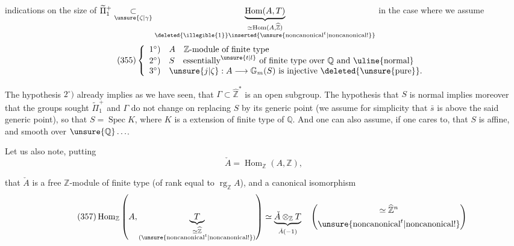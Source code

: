 

indications on the size of $\widetilde\Pi_1^{+}\underset{\unsure{\zeta|\gamma}}{\subset}\underbrace{\operatorname{Hom}(A,T)}_{\substack{\simeq\operatorname{Hom}(A,\widehat{\mathbb Z})\\\deleted{\illegible{1}}\inserted{\unsure{\text{noncanonical}^{t}|\text{noncanonical!}}}}}$ in the case where we assume
\[
\tag{355}
\left\{\begin{array}{ll}
1^\circ) & A\quad\mathbb Z\text{-module of finite type}\\
2^\circ) & S\quad\text{essentially}^{\unsure{t|l}}\text{ of finite type over }\mathbb Q\text{ and \uline{normal}}\\
3^\circ) & \unsure{j|\zeta}:A\longrightarrow\mathbb G_m(S)\text{ is injective }\deleted{\unsure{\text{pure}}}.
\end{array}\right.
\]

The hypothesis $2^\circ)$ already implies as we have seen, that $\Gamma\subset\widehat{\mathbb Z}^{*}$ is an open subgroup. The hypothesis that $S$ is normal implies moreover that the groups sought $\widetilde\Pi_1^{+}$ and $\Gamma$ do not change  on replacing $S$ by its generic point (we assume for simplicity that $\bar s$ is above the said generic point), so  that $S=\operatorname{Spec}K$, where $K$ is a  extension of finite type of $\mathbb Q$. And one can also assume, if one cares to, that $S$ is affine, and smooth over $\unsure{\mathbb Q}\ldots$.

Let us also note, putting
\[
\tag{356}
\check A=\operatorname{Hom}_{\mathbb Z}(A,\mathbb Z),
\]



that $\check A$ is a free $\mathbb Z$-module of finite type (of rank  equal to $\operatorname{rg}_{\mathbb Z}A$), and  a canonical isomorphism
\[
\tag{357}
\operatorname{Hom}_{\mathbb Z}\left(A,\underbrace{T}_{\substack{\simeq\widehat{\mathbb Z}\\(\unsure{\text{noncanonical}^{t}|\text{noncanonical!}})}}\right)
\simeq
\underbrace{\check A\otimes_{\mathbb Z}T}_{\check A(-1)}
\quad
\left(\begin{gathered}
\simeq\widehat{\mathbb Z}^{n}\\
\unsure{\text{noncanonical}^{t}|\text{noncanonical!}}
\end{gathered}\right)
\]

